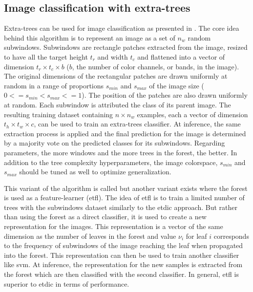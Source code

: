 \subsection{Image classification with extra-trees}
\label{ssec:backml:et_image}

Extra-trees can be used for image classification as presented in \parencite{maree2016towards}.
The core idea behind this algorithm is to represent an image as a set of $n_w$
random subwindows. Subwindows are rectangle patches extracted from the image,
resized to have all the target height $t_r$ and width $t_c$ and flattened into a
vector of dimension $t_r \times t_c \times b$ ($b$, the number of color channels,
or bands, in the image). The original dimensions of the rectangular patches are
drawn uniformly at random in a range of proportions $s_{min}$ and $s_{max}$ of
the image size ($0 <= s_{min} < s_{max} <= 1$). The position of the patches are
also drawn uniformly at random. Each subwindow is attributed the class of its
parent image. The resulting training dataset containing $n \times n_w$ examples,
each a vector of dimension $t_h \times t_w \times c$, can be used to train an
extra-trees classifier. At inference, the same extraction process is applied and
the final prediction for the image is determined by a majority vote on the predicted
classes for its subwindows. Regarding parameters, the more windows and the more
trees in the forest, the better. In addition to the tree complexity hyperparameters,
the image colorspace, $s_{min}$ and $s_{max}$ should be tuned as well to optimize
generalization.

This variant of the algorithm is called  but another variant
exists where the forest is used as a feature-learner (\acrshort{etfl}). The idea
of \acrshort{etfl} is to train a limited number of trees with the subwindows
dataset similarly to the \acrshort{etdic} approach. But rather than using the forest as
a direct classifier, it is used to create a new representation for the images. This
representation is a vector of the same dimension as the number of leaves in the
forest and value $\nu_i$ for leaf $i$ corresponds to the frequency of subwindows
of the image reaching the leaf when propagated into the forest. This representation
can then be used to train another classifier like \acrshort{svm}. At inference,
the representation for the new samples is extracted from the forest which are then
classified with the second classifier. In general, \acrshort{etfl} is superior to
\acrshort{etdic} in terms of performance.


